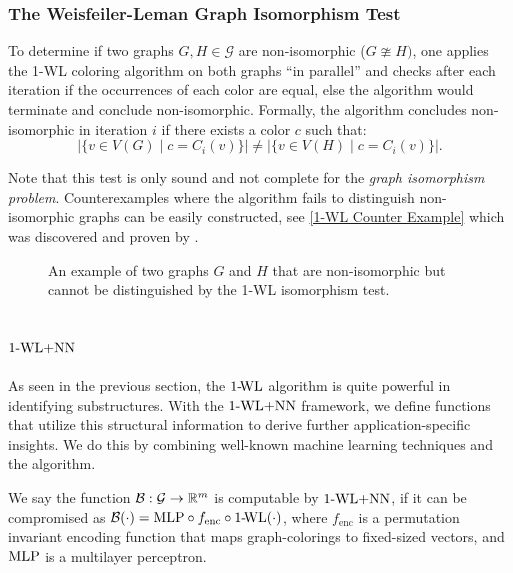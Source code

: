 \subsubsection{The Weisfeiler-Leman Graph Isomorphism Test}

\begin{definition}
    To determine if two graphs $G, H \in \mathcal{G}$ are non-isomorphic ($G \ncong H)$, one applies the 1-WL coloring algorithm on both graphs ``in parallel'' and checks after each iteration if the occurrences of each color are equal, else the algorithm would terminate and conclude non-isomorphic. Formally, the algorithm concludes non-isomorphic in iteration $i$ if there exists a color $c$ such that: 
    \begin{equation*}
        |\{ v \in V(G) \mid c = C_i(v)\} | \neq |\{ v \in V(H) \mid c = C_i(v)\} |.
    \end{equation*}
\end{definition}
Note that this test is only sound and not complete for the \textit{graph isomorphism problem}. Counterexamples where the algorithm fails to distinguish non-isomorphic graphs can be easily constructed, see \autoref{1-WL Counter Example} which was discovered and proven by \cite{Cai1992}.
\begin{figure}[H]
    \centering
    
    \caption{An example of two graphs $G$ and $H$ that are non-isomorphic but cannot be distinguished by the 1-WL isomorphism test.}
    \label{1-WL Counter Example}
\end{figure}

\subsection{$\wlnn$}
As seen in the previous section, the $\text{1-\!WL}$ algorithm is quite powerful in identifying substructures. With the $\wlnn$ framework, we define functions that utilize this structural information to derive further application-specific insights. We do this by combining well-known machine learning techniques and the algorithm.

\begin{definition}[$\wlnn$]
    We say the function $\mathcal{B}: \mathcal{G} \rightarrow \mathbb{R}^m$ is computable by $\wlnn$, if it can be compromised as $\mathcal{B}(\cdot) = \text{MLP} \circ f_{\text{enc}} \circ \text{1-\!WL}(\cdot)$, where $f_{\text{enc}}$ is a permutation invariant encoding function that maps graph-colorings to fixed-sized vectors, and $\text{MLP}$ is a multilayer perceptron.
\end{definition}

